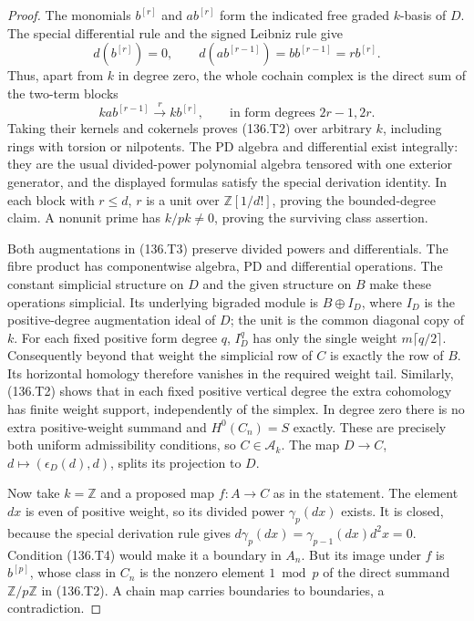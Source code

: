 \begin{proof}
The monomials $b^{[r]}$ and $ab^{[r]}$ form the indicated
free graded $k$-basis of $D$. The special differential rule
and the signed Leibniz rule give
\[
 d(b^{[r]})=0,\qquad
 d(ab^{[r-1]})=b b^{[r-1]}=r b^{[r]}.
\]
Thus, apart from $k$ in degree zero, the whole cochain complex
is the direct sum of the two-term blocks
\[
 k ab^{[r-1]}\xrightarrow{\ r\ }k b^{[r]},
       \qquad\text{in form degrees }2r-1,2r.
\]
Taking their kernels and cokernels proves (136.T2) over
arbitrary $k$, including rings with torsion or nilpotents.
The PD algebra and differential exist integrally: they are
the usual divided-power polynomial algebra tensored with
one exterior generator, and the displayed formulas satisfy
the special derivation identity. In each block with $r\le d$,
$r$ is a unit over $\mathbb Z[1/d!]$, proving the bounded-degree
claim. A nonunit prime has $k/pk\ne0$, proving the surviving
class assertion.

Both augmentations in (136.T3) preserve divided powers and
differentials. The fibre product has componentwise algebra,
PD and differential operations. The constant simplicial
structure on $D$ and the given structure on $B$ make these
operations simplicial. Its underlying bigraded module is
$B\oplus I_D$, where $I_D$ is the positive-degree augmentation
ideal of $D$; the unit is the common diagonal copy of $k$.
For each fixed positive form degree $q$, $I_D^q$ has only the
single weight $m\lceil q/2\rceil$.
Consequently beyond that weight the simplicial row of $C$
is exactly the row of $B$. Its horizontal homology therefore
vanishes in the required weight tail. Similarly, (136.T2)
shows that in each fixed positive vertical degree the extra
cohomology has finite weight support, independently of the
simplex. In degree zero there is no extra positive-weight
summand and $H^0(C_n)=S$ exactly. These are precisely both
uniform admissibility conditions, so $C\in\mathcal A_k$.
The map $D\to C$, $d\mapsto(\epsilon_D(d),d)$, splits its
projection to $D$.

Now take $k=\mathbb Z$ and a proposed map $f:A\to C$ as in
the statement. The element $dx$ is even of positive weight,
so its divided power $\gamma_p(dx)$ exists. It is closed,
because the special derivation rule gives
$d\gamma_p(dx)=\gamma_{p-1}(dx)d^2x=0$.
Condition (136.T4) would make it a boundary in $A_n$.
But its image under $f$ is $b^{[p]}$, whose class in $C_n$
is the nonzero element $1\bmod p$ of the direct summand
$\mathbb Z/p\mathbb Z$ in (136.T2). A chain map carries
boundaries to boundaries, a contradiction.
\end{proof}

